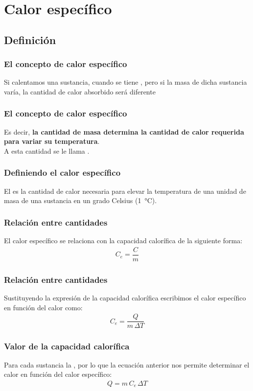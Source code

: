 \documentclass[14pt]{beamer}
\begin{document}
\section{Calor específico}
\subsection{Definición}

\begin{frame}
\frametitle{El concepto de calor específico}
Si calentamos una sustancia,  cuando se tiene , \pause pero si la masa de dicha sustancia varía, la cantidad de calor absorbido será diferente
\end{frame}
\begin{frame}
\frametitle{El concepto de calor específico}
Es decir, \textbf{la cantidad de masa determina la cantidad de calor requerida para variar su temperatura}.
\\
\bigskip
\pause
A esta cantidad se le llama .
\end{frame}
\begin{frame}
\frametitle{Definiendo el calor específico}
El  es la cantidad de calor necesaria para elevar la temperatura de una unidad de masa de una sustancia en un grado Celsius (\SI{1}{\degreeCelsius}).
\end{frame}
\begin{frame}
\frametitle{Relación entre cantidades}
El calor específico se relaciona con la capacidad calorífica de la siguiente forma:
\pause
\begin{align*}
C_{e} = \dfrac{C}{m}
\end{align*}
\end{frame}
\begin{frame}
\frametitle{Relación entre cantidades}
Sustituyendo la expresión de la capacidad calorífica escribimos el calor específico en función del calor como:
\pause
\begin{align*}
C_{e} = \dfrac{Q}{m \, \Delta T}
\end{align*}
\end{frame}
\begin{frame}
\frametitle{Valor de la capacidad calorífica}
Para cada sustancia la , \pause por lo que la ecuación anterior nos permite determinar el calor en función del calor específico:
\pause
\begin{align*}
Q = m \, C_{e} \, \Delta T
\end{align*}
\end{frame}
\end{document}
